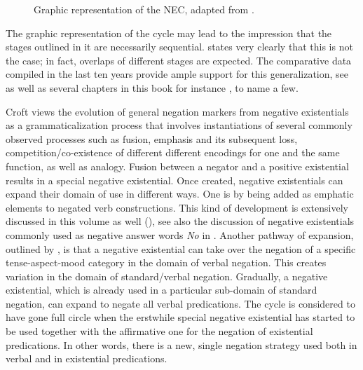 \documentclass[output=paper,chinesefont,colorlinks,citecolor=brown]{langscibook}
\begin{document}
\begin{figure} 
	\caption{Graphic representation of the NEC, adapted from \citet{Croft1991}.} \label{figure:nec1991}

\end{figure}\noindent

The graphic representation of the cycle may lead to the impression that the stages outlined in it are necessarily sequential. \citet[22]{Croft1991} states very clearly that this is not the case; in fact, overlaps of different stages are expected. The comparative data compiled in the last ten years provide ample support for this generalization, see \citet{Veselinova2016} as well as several chapters in this book for instance \citet{chapters/Wilmsen_Arabic,chapters/Oreal_AncientEgyptian,chapters/Lam_Chinese}, to name a few.

Croft views the evolution of general negation markers from negative existentials as a grammaticalization process that involves instantiations of several commonly observed processes such as fusion, emphasis and its subsequent loss, competition/co-existence of different different encodings for one and the same function, as well as analogy. Fusion between a negator and a positive existential results in a special negative existential. Once created, negative existentials can expand their domain of use in different ways. One is by being added as emphatic elements to negated verb constructions. This kind of development is extensively discussed in this volume as well (\citealt{chapters/Bantu-Bernander-Devos-Gibson,chapters/Guillaume_Tacana,chapters/Intertwining-Auwera-Krasnoukhova-Vossen}), see also the discussion of negative existentials commonly used as negative answer words \textit{No} in . Another pathway of expansion, outlined by \citet{Croft1991}, is that a negative existential can take over the negation of a specific tense-aspect-mood category in the domain of verbal negation. This creates variation in the domain of standard{\slash}verbal negation. Gradually, a negative existential, which is already used in a particular sub-domain of standard negation, can expand to negate all verbal predications. The cycle is considered to have gone full circle when the erstwhile special negative existential has started to be used together with the affirmative one for the negation of existential predications. In other words, there is a new, single negation strategy used both in verbal and in existential predications.
\end{document}

